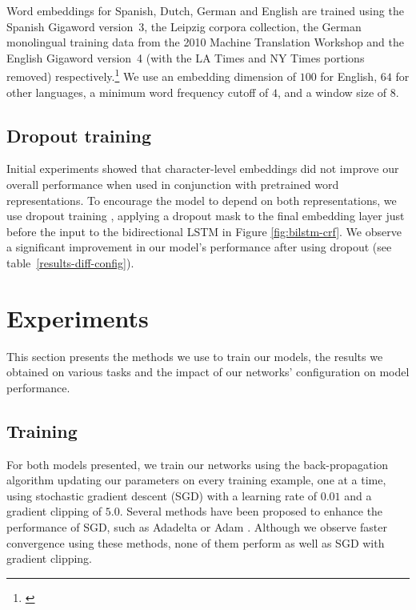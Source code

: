 \documentclass[11pt,letterpaper]{article}
\newcommand{\ignore}[1]{}
\newcommand{\guillaumecomment}[1]{\ignore{\textcolor{orange}{\textbf{[#1 --\textsc{GL}]}}}}
\begin{document}
Word embeddings for Spanish, Dutch, German and English are trained using the Spanish Gigaword version~3, the Leipzig corpora collection, the German monolingual training data from the 2010 Machine Translation Workshop and the English Gigaword version~4 (with the LA Times and NY Times portions removed) respectively.\footnote{\cite{graff2011spanish,biemann2007leipzig,callison2010findings,englishgigaword}} We use an embedding dimension of $100$ for English, $64$ for other languages, a minimum word frequency cutoff of $4$, and a window size of $8$.

\ignore{
Spanish:
          Lines: 34,145,390
         Tokens: 1,066,774,432
          Types: 3,257,431
     Singletons: 1,675,131

Dutch
          Lines: 1,000,006
         Tokens: 17,645,554
          Types: 650,980
     Singletons: 415,383

German
          Lines: 46,059,414
         Tokens: 817,561,850
          Types: 7,134,443
     Singletons: 4,110,035

English
          Lines: 24,517,385
         Tokens: 593,524,637
          Types: 1,588,637
     Singletons: 808,462
}


\subsection{Dropout training}\label{sec:dropout}
Initial experiments showed that character-level embeddings did not improve our overall performance when used in conjunction with pretrained word representations. To encourage the model to depend on both representations, we use dropout training \cite{dropout}, applying a dropout mask to the final embedding layer just before the input to the bidirectional LSTM in Figure \ref{fig:bilstm-crf}. We observe a significant improvement in our model's performance after using dropout (see table~\ref{results-diff-config}).

\section{Experiments}\label{sec:experiments}

This section presents the methods we use to train our models, the results we obtained on various tasks and the impact of our networks' configuration on model performance.

\subsection{Training}
For both models presented, we train our networks using the back-propagation algorithm updating our parameters on every training example, one at a time, using stochastic gradient descent (SGD) with a learning rate of $0.01$ and a gradient clipping of $5.0$. Several methods have been proposed to enhance the performance of SGD, such as Adadelta \cite{adadelta} or Adam \cite{adam}. Although we observe faster convergence using these methods, none of them perform as well as SGD with gradient clipping.
\guillaumecomment{the 2 sentences above are maybe not super important}
\end{document}
